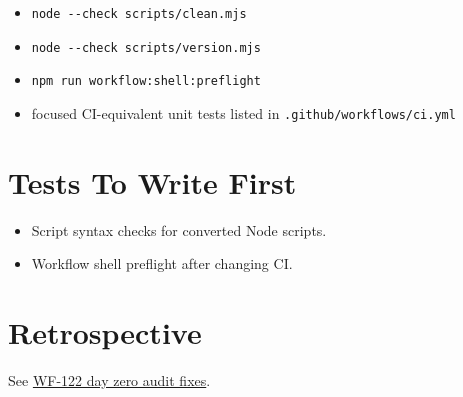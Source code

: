 \begin{itemize}
\tightlist
\item
  \texttt{n\allowbreak{}o\allowbreak{}d\allowbreak{}e\allowbreak{} \allowbreak{}-\allowbreak{}-\allowbreak{}c\allowbreak{}h\allowbreak{}e\allowbreak{}c\allowbreak{}k\allowbreak{} \allowbreak{}s\allowbreak{}c\allowbreak{}r\allowbreak{}i\allowbreak{}p\allowbreak{}t\allowbreak{}s\allowbreak{}/\allowbreak{}c\allowbreak{}l\allowbreak{}e\allowbreak{}a\allowbreak{}n\allowbreak{}.\allowbreak{}m\allowbreak{}j\allowbreak{}s}
\item
  \texttt{n\allowbreak{}o\allowbreak{}d\allowbreak{}e\allowbreak{} \allowbreak{}-\allowbreak{}-\allowbreak{}c\allowbreak{}h\allowbreak{}e\allowbreak{}c\allowbreak{}k\allowbreak{} \allowbreak{}s\allowbreak{}c\allowbreak{}r\allowbreak{}i\allowbreak{}p\allowbreak{}t\allowbreak{}s\allowbreak{}/\allowbreak{}v\allowbreak{}e\allowbreak{}r\allowbreak{}s\allowbreak{}i\allowbreak{}o\allowbreak{}n\allowbreak{}.\allowbreak{}m\allowbreak{}j\allowbreak{}s}
\item
  \texttt{n\allowbreak{}p\allowbreak{}m\allowbreak{} \allowbreak{}r\allowbreak{}u\allowbreak{}n\allowbreak{} \allowbreak{}w\allowbreak{}o\allowbreak{}r\allowbreak{}k\allowbreak{}f\allowbreak{}l\allowbreak{}o\allowbreak{}w\allowbreak{}:\allowbreak{}s\allowbreak{}h\allowbreak{}e\allowbreak{}l\allowbreak{}l\allowbreak{}:\allowbreak{}p\allowbreak{}r\allowbreak{}e\allowbreak{}f\allowbreak{}l\allowbreak{}i\allowbreak{}g\allowbreak{}h\allowbreak{}t}
\item
  focused CI-equivalent unit tests listed in \texttt{.\allowbreak{}g\allowbreak{}i\allowbreak{}t\allowbreak{}h\allowbreak{}u\allowbreak{}b\allowbreak{}/\allowbreak{}w\allowbreak{}o\allowbreak{}r\allowbreak{}k\allowbreak{}f\allowbreak{}l\allowbreak{}o\allowbreak{}w\allowbreak{}s\allowbreak{}/\allowbreak{}c\allowbreak{}i\allowbreak{}.\allowbreak{}y\allowbreak{}m\allowbreak{}l}
\end{itemize}

\section{Tests To Write First}\label{record-206-tests-to-write-first}

\begin{itemize}
\tightlist
\item
  Script syntax checks for converted Node scripts.
\item
  Workflow shell preflight after changing CI.
\end{itemize}

\section{Retrospective}\label{record-206-retrospective}

See \href{https://github.com/flyingrobots/bijou/blob/cbd70612140e7a450d764b3c7be1c6af878b99bc/docs/method/retro/WF-122-day-zero-audit-fixes.md}{WF-122 day zero audit fixes}.

